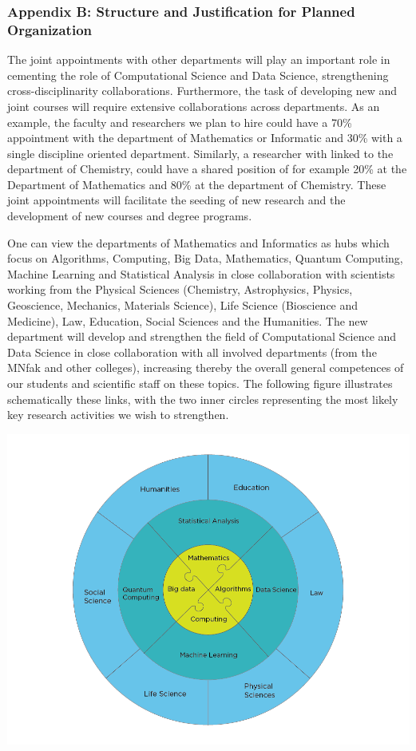 \documentclass[]{article}
\begin{document}
\hypertarget{appendix-b-structure-and-justification-for-planned-organization}{%
\subsubsection{Appendix B: Structure and Justification for Planned
Organization}\label{appendix-b-structure-and-justification-for-planned-organization}}

The joint appointments with other departments will play an important
role in cementing the role of Computational Science and Data Science,
strengthening cross-disciplinarity collaborations. Furthermore, the task
of developing new and joint courses will require extensive
collaborations across departments. As an example, the faculty and
researchers we plan to hire could have a 70\% appointment with the
department of Mathematics or Informatic and 30\% with a single
discipline oriented department. Similarly, a researcher with linked to
the department of Chemistry, could have a shared position of for example
20\% at the Department of Mathematics and 80\% at the department of
Chemistry. These joint appointments will facilitate the seeding of new
research and the development of new courses and degree programs.

One can view the departments of Mathematics and Informatics as hubs
which focus on Algorithms, Computing, Big Data, Mathematics, Quantum
Computing, Machine Learning and Statistical Analysis in close
collaboration with scientists working from the Physical Sciences
(Chemistry, Astrophysics, Physics, Geoscience, Mechanics, Materials
Science), Life Science (Bioscience and Medicine), Law, Education, Social
Sciences and the Humanities. The new department will develop and
strengthen the field of Computational Science and Data Science in close
collaboration with all involved departments (from the MNfak and other
colleges), increasing thereby the overall general competences of our
students and scientific staff on these topics. The following figure
illustrates schematically these links, with the two inner circles
representing the most likely key research activities we wish to
strengthen.

\includegraphics{figslides/topics.png}
\end{document}
